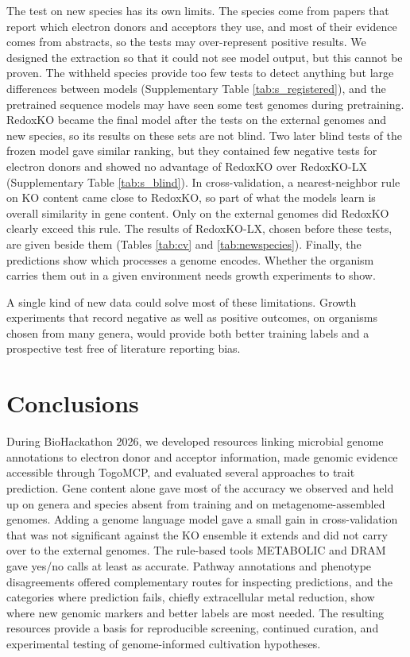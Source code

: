 \documentclass[10pt,a4paper,onecolumn]{article}
\begin{document}
The test on new species has its own limits. The species come from papers
that report which electron donors and acceptors they use, and most of
their evidence comes from abstracts, so the tests may over-represent
positive results. We designed the extraction so that it could not see
model output, but this cannot be proven. The withheld species provide
too few tests to detect anything but large differences between models
(Supplementary Table \ref{tab:s_registered}), and the pretrained
sequence models may have seen some test genomes during pretraining.
RedoxKO became the final model after the tests on the external genomes
and new species, so its results on these sets are not blind. Two later
blind tests of the frozen model gave similar ranking, but they contained
few negative tests for electron donors and showed no advantage of
RedoxKO over RedoxKO-LX (Supplementary Table \ref{tab:s_blind}). In
cross-validation, a nearest-neighbor rule on KO content came close to
RedoxKO, so part of what the models learn is overall similarity in gene
content. Only on the external genomes did RedoxKO clearly exceed this
rule. The results of RedoxKO-LX, chosen before these tests, are given
beside them (Tables \ref{tab:cv} and \ref{tab:newspecies}). Finally, the
predictions show which processes a genome encodes. Whether the organism
carries them out in a given environment needs growth experiments to
show.

A single kind of new data could solve most of these limitations. Growth
experiments that record negative as well as positive outcomes, on
organisms chosen from many genera, would provide both better training
labels and a prospective test free of literature reporting bias.

\section{Conclusions}\label{conclusions}

During BioHackathon 2026, we developed resources linking microbial
genome annotations to electron donor and acceptor information, made
genomic evidence accessible through TogoMCP, and evaluated several
approaches to trait prediction. Gene content alone gave most of the
accuracy we observed and held up on genera and species absent from
training and on metagenome-assembled genomes. Adding a genome language
model gave a small gain in cross-validation that was not significant
against the KO ensemble it extends and did not carry over to the
external genomes. The rule-based tools METABOLIC and DRAM gave yes/no
calls at least as accurate. Pathway annotations and phenotype
disagreements offered complementary routes for inspecting predictions,
and the categories where prediction fails, chiefly extracellular metal
reduction, show where new genomic markers and better labels are most
needed. The resulting resources provide a basis for reproducible
screening, continued curation, and experimental testing of
genome-informed cultivation hypotheses.
\end{document}
